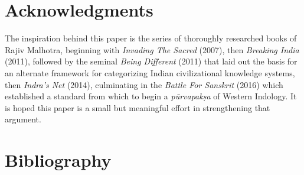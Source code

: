 \section*{Acknowledgments}

The inspiration behind this paper is the series of thoroughly researched books of Rajiv Malhotra, beginning with \textit{Invading The Sacred} (2007), then \textit{Breaking India} (2011), followed by the seminal \textit{Being Different} (2011) that laid out the basis for an alternate framework for categorizing Indian civilizational knowledge systems, then \textit{Indra’s Net} (2014), culminating in the \textit{Battle For Sanskrit} (2016) which established a standard from which to begin a \textit{pūrvapakṣa} of Western Indology. It is hoped this paper is a small but meaningful effort in strengthening that argument.


\section*{Bibliography}

